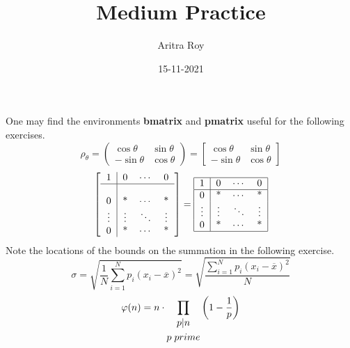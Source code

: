 \documentclass[10pt]{article}
\title{Medium Practice}
\date{15-11-2021}
\author{Aritra Roy}
\begin{document}
\maketitle
One may find the environments \textbf{bmatrix} and \textbf{pmatrix} useful for the following exercises.
\[\rho_\theta=\begin{pmatrix}\cos\theta & \sin\theta\\-\sin\theta & \cos\theta \end{pmatrix}=\begin{bmatrix}\cos\theta & \sin\theta\\-\sin\theta & \cos\theta \end{bmatrix}\]
\[\left[\begin{tabular}{c|c c c}
    1&0&$\cdots$&0\\
    \hline\\
    0&*&$\cdots$&*\\
    $\vdots$&$\vdots$&$\ddots$&$\vdots$\\
    0&*&$\cdots$&*
\end{tabular}\right]=
\begin{tabular}{|c|c c c|}
    \hline
    1&0&$\cdots$&0\\
    \hline
    0&*&$\cdots$&*\\
    $\vdots$&$\vdots$&$\ddots$&$\vdots$\\
    0&*&$\cdots$&*\\
    \hline
\end{tabular}
\]
Note the locations of the bounds on the summation in the following exercise.
\[\sigma=\sqrt{\frac{1}{N}\sum_{i=1}^Np_i{(x_i-\overline{x})}^2}=\sqrt{\frac{\displaystyle\sum_{i=1}^Np_i{(x_i-\overline{x})}^2}{N}} \]
\begin{equation}
\varphi(n)=n\cdot\prod_{\begin{gathered}{p|n}\\{p\hspace{1mm}prime}\end{gathered}}\left(1-\frac{1}{p}\right)
\end{equation}
\end{document}
